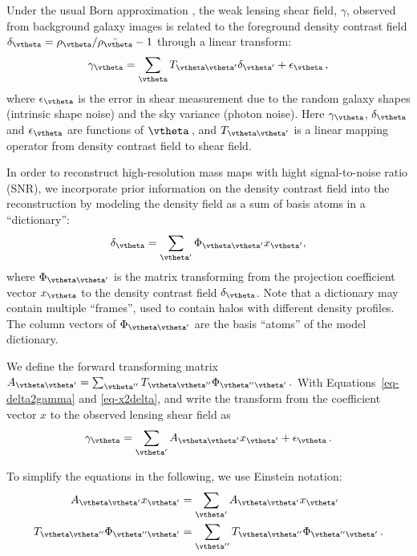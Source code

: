 \documentclass[twocolumn, usenames, dvipsnames]{aastex63}
\begin{document}
Under the usual Born approximation \citep{born_Petri2017}, the weak lensing shear
field, $\gamma$, observed from background galaxy images is related to the
foreground density contrast field $\delta_\vtheta= \rho_\vtheta
/\bar{\rho_\vtheta}-1$ through a linear transform:
\begin{equation}\label{eq-delta2gamma}
    \gamma_{\vtheta} =
    \sum_\vtheta T_{\vtheta\vtheta'} \delta_{\vtheta'} + \epsilon_\vtheta\,,
\end{equation}
where $\epsilon_\vtheta$ is the error in shear measurement due to the random
galaxy shapes (intrinsic shape noise) and the sky variance (photon noise). Here
$\gamma_\vtheta$, $\delta_\vtheta$ and $\epsilon_\vtheta$ are functions of
$\vtheta\,$, and $T_{\vtheta \vtheta'}$ is a linear mapping operator from
density contrast field to shear field.

In order to reconstruct high-resolution mass maps with hight signal-to-noise
ratio (SNR), we incorporate prior information on the density contrast field
into the reconstruction by modeling the density field as a sum of basis atoms
in a ``dictionary'':
\begin{equation}\label{eq-x2delta}
    \delta_{\vtheta} = \sum_{\vtheta'}\Phi_{\vtheta\vtheta'} x_{\vtheta'},
\end{equation}
where $\Phi_{\vtheta\vtheta'}$ is the matrix transforming from the projection
coefficient vector $x_\vtheta$ to the density contrast field $\delta_\vtheta$.
Note that a dictionary may contain multiple ``frames'', used to contain halos with different density profiles.
The column vectors of $\Phi_{\vtheta\vtheta'}$ are the basis ``atoms'' of the
model dictionary.

We define the forward transforming matrix $A_{\vtheta\vtheta'}=
\sum_{\vtheta''}T_{\vtheta\vtheta''} \Phi_{\vtheta'' \vtheta'}\,.$ With
Equations~\eqref{eq-delta2gamma} and \eqref{eq-x2delta}, and write the
transform from the coefficient vector $x$ to the observed lensing shear field
as
\begin{equation}\label{eq-x2gamma}
    \gamma_{\vtheta}=\sum_{\vtheta'}A_{\vtheta \vtheta'} x_{\vtheta'}
    + \epsilon_{\vtheta}\,.
\end{equation}

To simplify the equations in the following, we use Einstein notation:
\begin{equation}
\begin{split}
  A_{\vtheta \vtheta'} x_{\vtheta'}
  &= \sum_{\vtheta'} A_{\vtheta \vtheta'} x_{\vtheta'}\\
  T_{\vtheta\vtheta''} \Phi_{\vtheta'' \vtheta'}
  &= \sum_{\vtheta''}T_{\vtheta\vtheta''} \Phi_{\vtheta'' \vtheta'}\,.
\end{split}
\end{equation}
\end{document}
